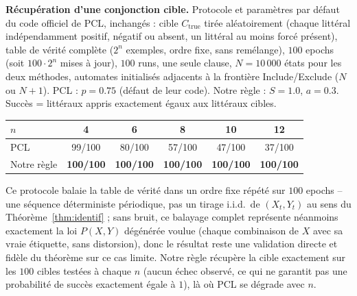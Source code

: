 \documentclass[12pt,a4paper]{article}
\begin{document}
\textbf{Récupération d'une conjonction cible.} Protocole et paramètres par
défaut du code officiel de PCL, inchangés : cible $C_{\mathrm{true}}$
tirée aléatoirement (chaque littéral indépendamment positif, négatif ou
absent, un littéral au moins forcé présent), table de vérité complète
($2^n$ exemples, ordre fixe, sans remélange), $100$ epochs (soit $100
\cdot 2^n$ mises à jour), $100$ runs, une seule clause, $N{=}10\,000$
états pour les deux méthodes, automates initialisés adjacents à la
frontière Include/Exclude ($N$ ou $N{+}1$). PCL : $p{=}0.75$ (défaut de
leur code). Notre règle : $S{=}1.0$, $a{=}0.3$. Succès = littéraux appris
exactement égaux aux littéraux cibles.
\begin{center}
\begin{tabular}{lccccc}
\toprule
$n$ & 4 & 6 & 8 & 10 & 12 \\
\midrule
PCL & 99/100 & 80/100 & 57/100 & 47/100 & 37/100 \\
Notre règle & \textbf{100/100} & \textbf{100/100} & \textbf{100/100} & \textbf{100/100} & \textbf{100/100} \\
\bottomrule
\end{tabular}
\end{center}
Ce protocole balaie la table de vérité dans un ordre fixe répété sur $100$
epochs -- une séquence déterministe périodique, pas un tirage i.i.d.\ de
$(X_t,Y_t)$ au sens du Théorème~\ref{thm:identif} ; sans bruit, ce balayage
complet représente néanmoins exactement la loi $P(X,Y)$ dégénérée voulue
(chaque combinaison de $X$ avec sa vraie étiquette, sans distorsion), donc
le résultat reste une validation directe et fidèle du théorème sur ce cas
limite. Notre règle récupère la cible exactement sur les $100$ cibles
testées à chaque $n$ (aucun échec observé, ce qui ne garantit pas une
probabilité de succès exactement égale à $1$), là où PCL se dégrade avec
$n$.
\end{document}

